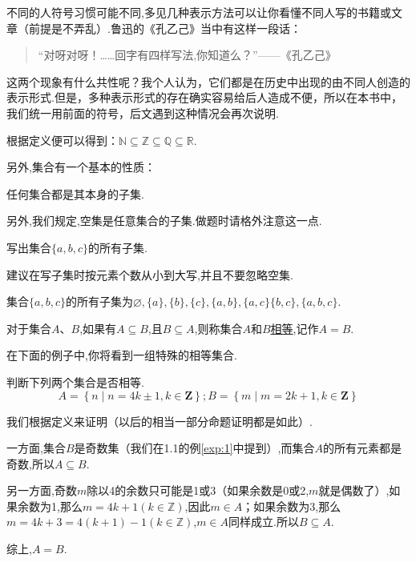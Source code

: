 \documentclass[lang=cn,math=cm,chinesefont=nofont,11pt,scheme=chinese,twocol]{elegantbook}
\begin{document}
不同的人符号习惯可能不同,多见几种表示方法可以让你看懂不同人写的书籍或文章（前提是不弄乱）.鲁迅的《孔乙己》当中有这样一段话：

\begin{quotation}
  “对呀对呀！……回字有四样写法,你知道么？”——《孔乙己》
\end{quotation}

这两个现象有什么共性呢？我个人认为，它们都是在历史中出现的由不同人创造的表示形式.但是，多种表示形式的存在确实容易给后人造成不便，所以在本书中，我们统一用前面的符号，后文遇到这种情况会再次说明.

根据定义便可以得到：$\mathbb{N}\subseteq\mathbb{Z}\subseteq\mathbb{Q}\subseteq\mathbb{R}$.

  另外,集合有一个基本的性质：

\begin{property}
  任何集合都是其本身的子集.
\end{property}

另外,我们规定,空集是任意集合的子集.做题时请格外注意这一点.

\begin{example}
  写出集合$\{a,b,c\}$的所有子集.
\end{example}

\begin{remark}
  建议在写子集时按元素个数从小到大写,并且不要忽略空集.
\end{remark}

\begin{solution}
  集合$\{a,b,c\}$的所有子集为$\varnothing ,\{a\},\{b\},\{c\},\{a,b\},\{a,c\}\{b,c\},\{a,b,c\}$.
\end{solution}

\begin{definition}[集合的相等]
  对于集合$A$、$B$,如果有$A\subseteq B$,且$B\subseteq A$,则称集合$A$和$B$\underline{相等},记作$A=B$.
\end{definition}

在下面的例子中,你将看到一组特殊的相等集合.

\begin{example}\label{exp:2}
  判断下列两个集合是否相等.
  $$A=\left\{n\mid n=4k\pm1,k\in\mathbf{Z}\right\};B=\left\{m\mid m=2k+1,k\in\mathbf{Z}\right\}$$
\end{example}

\begin{solution}
  我们根据定义来证明（以后的相当一部分命题证明都是如此）.

  一方面,集合$B$是奇数集（我们在1.1的例\ref{exp:1}中提到）,而集合$A$的所有元素都是奇数,所以$A\subseteq B$.

  另一方面,奇数$m$除以4的余数只可能是1或3（如果余数是0或2,$m$就是偶数了）,如果余数为1,那么$m=4k+1(k\in\mathbb{Z})$,因此$m\in A$；如果余数为3,那么$m=4k+3=4(k+1)-1(k\in\mathbb{Z})$,$m\in A$同样成立.所以$B\subseteq A$.

  综上,$A=B$.
\end{solution}
\end{document}
